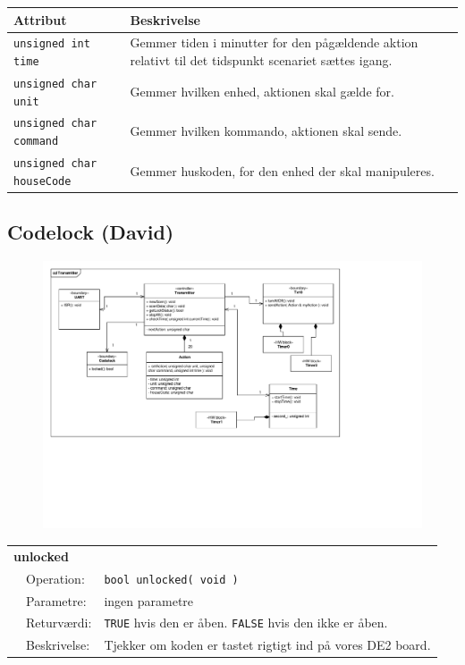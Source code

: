 \begin{table}[h]
\centering
\begin{tabularx}{13 cm}{|l |X|} \hline
Attribut & Beskrivelse \\ \hline

\texttt{unsigned int time} & Gemmer tiden i minutter for den pågældende aktion relativt til det tidspunkt scenariet sættes igang. \\ \hline
\texttt{unsigned char unit} & Gemmer hvilken enhed, aktionen skal gælde for. \\ \hline
\texttt{unsigned char command} & Gemmer hvilken kommando, aktionen skal sende. \\ \hline
\texttt{unsigned char houseCode} & Gemmer huskoden, for den enhed der skal manipuleres. \\ \hline
\end{tabularx}
\end{table}

\clearpage
\subsection{Codelock (David)}

\begin{figure}[h]
\centering
\includegraphics[scale=1,clip=true, trim=80 330 650 203]{Systemarkitektur/diagrammer/Transmitter_Klassediagram} %
\end{figure}

\begin{table}[h]
\begin{tabularx}{\textwidth}{p{0.6 cm} l X} %
\multicolumn{3}{l}{\textbf{unlocked}}\\
& Operation: & %
\texttt{bool unlocked( void )}
\\ & Parametre: & %
ingen parametre
\\ & Returværdi: & %
\texttt{TRUE} hvis den er åben. \texttt{FALSE} hvis den ikke er åben.
\\ & Beskrivelse: & %
Tjekker om koden er tastet rigtigt ind på vores DE2 board.
\\ \end{tabularx}
\end{table}

